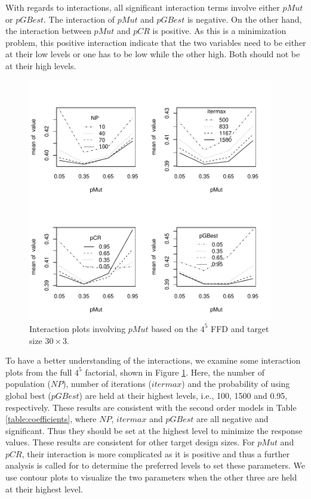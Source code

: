 \documentclass [PhD] {package/uclathes}
\begin{document}
With regards to interactions, all significant interaction terms involve either $pMut$ or $pGBest$. The interaction of $pMut$ and $pGBest$ is negative. On the other hand, the interaction between $pMut$ and $pCR$ is positive. As this is a minimization problem, this positive interaction indicate that the two variables need to be either at their low levels or one has to be low while the other high. Both should not be at their high levels.


\begin{figure}
\centering
\includegraphics[width=0.95\textwidth]{chapters/DE/pdfs/interactions}
\caption{Interaction plots involving $pMut$ based on the $4^5$ FFD and target size $30\times3$.}
\label{interaction}
\end{figure}


To have a better understanding of the interactions, we examine some interaction plots from the full $4^5$  factorial, shown in Figure \ref{interaction}. Here, the number of population ($NP$), number of iterations ($itermax$) and the probability of using global best ($pGBest$) are held at their highest levels, i.e., 100, 1500 and 0.95, respectively. These results are consistent with the second order models in Table \ref{table:coefficients}, where $NP$, $itermax$ and $pGBest$ are all negative and significant. Thus they should be set at the highest level to minimize the response values. These results are consistent for other target design sizes. For $pMut$ and $pCR$, their interaction is more complicated as it is positive and thus a further analysis is called for to determine the preferred levels to set these parameters. We use contour plots to visualize the two parameters when the other three are held at their highest level.
\end{document}
